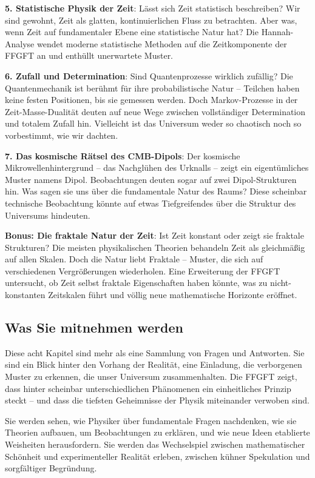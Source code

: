 \documentclass[11pt,oneside]{book}
\begin{document}
	\textbf{5. Statistische Physik der Zeit}: Lässt sich Zeit statistisch beschreiben? Wir sind gewohnt, Zeit als glatten, kontinuierlichen Fluss zu betrachten. Aber was, wenn Zeit auf fundamentaler Ebene eine statistische Natur hat? Die Hannah-Analyse wendet moderne statistische Methoden auf die Zeitkomponente der FFGFT an und enthüllt unerwartete Muster.
	
	\textbf{6. Zufall und Determination}: Sind Quantenprozesse wirklich zufällig? Die Quantenmechanik ist berühmt für ihre probabilistische Natur – Teilchen haben keine festen Positionen, bis sie gemessen werden. Doch Markov-Prozesse in der Zeit-Masse-Dualität deuten auf neue Wege zwischen vollständiger Determination und totalem Zufall hin. Vielleicht ist das Universum weder so chaotisch noch so vorbestimmt, wie wir dachten.
	
	\textbf{7. Das kosmische Rätsel des CMB-Dipols}: Der kosmische Mikrowellenhintergrund – das Nachglühen des Urknalls – zeigt ein eigentümliches Muster namens Dipol. Beobachtungen deuten sogar auf zwei Dipol-Strukturen hin. Was sagen sie uns über die fundamentale Natur des Raums? Diese scheinbar technische Beobachtung könnte auf etwas Tiefgreifendes über die Struktur des Universums hindeuten.
	
	\textbf{Bonus: Die fraktale Natur der Zeit}: Ist Zeit konstant oder zeigt sie fraktale Strukturen? Die meisten physikalischen Theorien behandeln Zeit als gleichmäßig auf allen Skalen. Doch die Natur liebt Fraktale – Muster, die sich auf verschiedenen Vergrößerungen wiederholen. Eine Erweiterung der FFGFT untersucht, ob Zeit selbst fraktale Eigenschaften haben könnte, was zu nicht-konstanten Zeitskalen führt und völlig neue mathematische Horizonte eröffnet.
	
	\subsection*{Was Sie mitnehmen werden}
	
	Diese acht Kapitel sind mehr als eine Sammlung von Fragen und Antworten. Sie sind ein Blick hinter den Vorhang der Realität, eine Einladung, die verborgenen Muster zu erkennen, die unser Universum zusammenhalten. Die FFGFT zeigt, dass hinter scheinbar unterschiedlichen Phänomenen ein einheitliches Prinzip steckt – und dass die tiefsten Geheimnisse der Physik miteinander verwoben sind.
	
	Sie werden sehen, wie Physiker über fundamentale Fragen nachdenken, wie sie Theorien aufbauen, um Beobachtungen zu erklären, und wie neue Ideen etablierte Weisheiten herausfordern. Sie werden das Wechselspiel zwischen mathematischer Schönheit und experimenteller Realität erleben, zwischen kühner Spekulation und sorgfältiger Begründung.
	
\end{document}
